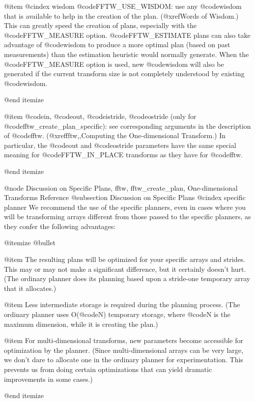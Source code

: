 @item
@cindex wisdom
@code{FFTW_USE_WISDOM}: use any @code{wisdom} that is available to help
in the creation of the plan. (@xref{Words of Wisdom}.)
This can greatly speed the creation of plans, especially with the
@code{FFTW_MEASURE} option. @code{FFTW_ESTIMATE} plans can also take
advantage of @code{wisdom} to produce a more optimal plan (based on past
measurements) than the estimation heuristic would normally
generate. When the @code{FFTW_MEASURE} option is used, new @code{wisdom}
will also be generated if the current transform size is not completely
understood by existing @code{wisdom}.

@end itemize

@item
@code{in}, @code{out}, @code{istride}, @code{ostride} (only for
@code{fftw_create_plan_specific}): see corresponding arguments in the
description of @code{fftw}.  (@xref{fftw,,Computing the One-dimensional
Transform}.)  In particular, the @code{out} and @code{ostride}
parameters have the same special meaning for @code{FFTW_IN_PLACE}
transforms as they have for @code{fftw}.

@end itemize

@node Discussion on Specific Plans, fftw, fftw_create_plan, One-dimensional Transforms Reference
@subsection Discussion on Specific Plans
@cindex specific planner
We recommend the use of the specific planners, even in cases where you
will be transforming arrays different from those passed to the specific
planners, as they confer the following advantages:

@itemize @bullet

@item
The resulting plans will be optimized for your specific arrays and
strides.  This may or may not make a significant difference, but it
certainly doesn't hurt.  (The ordinary planner does its planning based
upon a stride-one temporary array that it allocates.)

@item
Less intermediate storage is required during the planning process.  (The
ordinary planner uses O(@code{N}) temporary storage, where @code{N} is
the maximum dimension, while it is creating the plan.)

@item
For multi-dimensional transforms, new parameters become accessible for
optimization by the planner.  (Since multi-dimensional arrays can be
very large, we don't dare to allocate one in the ordinary planner for
experimentation.  This prevents us from doing certain optimizations
that can yield dramatic improvements in some cases.)

@end itemize


